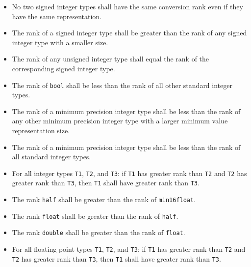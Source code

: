 \begin{itemize}
  \item  No two signed integer types shall have the same conversion rank even if
  they have the same representation.
  \item The rank of a signed integer type shall be greater than the rank of any
  signed integer type with a smaller size.
  \item The rank of any unsigned integer type shall equal the rank of the
  corresponding signed integer type.
  \item The rank of \texttt{bool} shall be less than the rank of all other
  standard integer types.
  \item The rank of a minimum precision integer type shall be less than the rank
  of any other minimum precision integer type with a larger minimum value
  representation size.
  \item The rank of a minimum precision integer type shall be less than the rank
  of all standard integer types.
  \item For all integer types \texttt{T1}, \texttt{T2}, and \texttt{T3}: if
  \texttt{T1} has greater rank than \texttt{T2} and \texttt{T2} has greater rank
  than \texttt{T3}, then \texttt{T1} shall have greater rank than \texttt{T3}.
\end{itemize}


\begin{itemize}
  \item The rank \texttt{half} shall be greater than the rank of
  \texttt{min16float}.
  \item The rank \texttt{float} shall be greater than the rank of \texttt{half}.
  \item The rank \texttt{double} shall be greater than the rank of
  \texttt{float}.
  \item For all floating point types \texttt{T1}, \texttt{T2}, and \texttt{T3}:
  if \texttt{T1} has greater rank than \texttt{T2} and \texttt{T2} has greater
  rank than \texttt{T3}, then \texttt{T1} shall have greater rank than
  \texttt{T3}.
\end{itemize}
